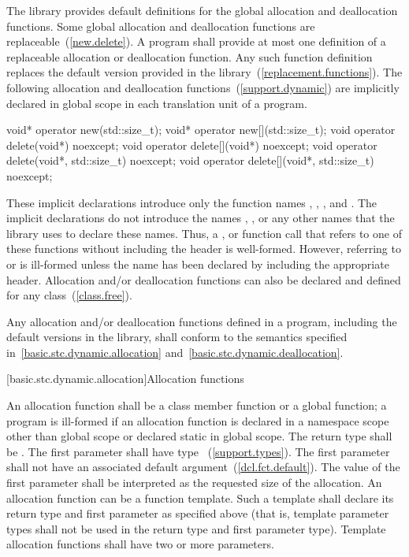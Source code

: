 \pnum
The library provides default definitions for the global allocation and
deallocation functions. Some global allocation and deallocation
functions are replaceable~(\ref{new.delete}). A \Cpp program shall
provide at most one definition of a replaceable allocation or
deallocation function. Any such function definition replaces the default
version provided in the library~(\ref{replacement.functions}). The
following allocation and deallocation functions~(\ref{support.dynamic})
are implicitly declared in global scope in each translation unit of a
program.

\begin{codeblock}
void* operator new(std::size_t);
void* operator new[](std::size_t);
void operator delete(void*) noexcept;
void operator delete[](void*) noexcept;
void operator delete(void*, std::size_t) noexcept;
void operator delete[](void*, std::size_t) noexcept;
\end{codeblock}

These implicit declarations introduce only the function names
 ,  ,
 , and 
. \enternote The implicit declarations do not introduce
the names ,
, or any other names that the library uses to
declare these names. Thus, a ,
 or function call that refers to one of
these functions without including the header  is
well-formed. However, referring to 
or  is ill-formed unless the name has been declared
by including the appropriate header. \exitnote Allocation and/or
deallocation functions can also be declared and defined for any
class~(\ref{class.free}).

\pnum
Any allocation and/or deallocation functions defined in a \Cpp program,
including the default versions in the library, shall conform to the
semantics specified in~\ref{basic.stc.dynamic.allocation}
and~\ref{basic.stc.dynamic.deallocation}.

[basic.stc.dynamic.allocation]{Allocation functions}

\pnum
{}%
An allocation function shall be a class member function or a global
function; a program is ill-formed if an allocation function is declared
in a namespace scope other than global scope or declared static in
global scope. The return type shall be . The first
parameter shall have type ~(\ref{support.types}). The
first parameter shall not have an associated default
argument~(\ref{dcl.fct.default}). The value of the first parameter shall
be interpreted as the requested size of the allocation. An allocation
function can be a function template. Such a template shall declare its
return type and first parameter as specified above (that is, template
parameter types shall not be used in the return type and first parameter
type). Template allocation functions shall have two or more parameters.

